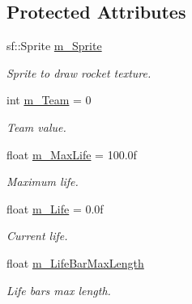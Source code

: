 \subsection*{Protected Attributes}
\begin{DoxyCompactItemize}
\item 
\mbox{\label{class_rocket_a584dfdd155f46944168ebfd23b158bf2}} 
sf\+::\+Sprite \hyperlink{class_rocket_a584dfdd155f46944168ebfd23b158bf2}{m\+\_\+\+Sprite}
\begin{DoxyCompactList}\small\item\em Sprite to draw rocket texture. \end{DoxyCompactList}\item 
\mbox{\label{class_rocket_a5d12b42180029361f37e9ce86a75f1eb}} 
int \hyperlink{class_rocket_a5d12b42180029361f37e9ce86a75f1eb}{m\+\_\+\+Team} = 0
\begin{DoxyCompactList}\small\item\em Team value. \end{DoxyCompactList}\item 
\mbox{\label{class_rocket_a6e8e5f6f965fa1fc8d7919b4c7a7d42b}} 
float \hyperlink{class_rocket_a6e8e5f6f965fa1fc8d7919b4c7a7d42b}{m\+\_\+\+Max\+Life} = 100.\+0f
\begin{DoxyCompactList}\small\item\em Maximum life. \end{DoxyCompactList}\item 
\mbox{\label{class_rocket_a564ba8da5fdab5a6bccef0adfb58864d}} 
float \hyperlink{class_rocket_a564ba8da5fdab5a6bccef0adfb58864d}{m\+\_\+\+Life} = 0.\+0f
\begin{DoxyCompactList}\small\item\em Current life. \end{DoxyCompactList}\item 
\mbox{\label{class_rocket_a66c5adff518ec4cd545a3a669e8448c7}} 
float \hyperlink{class_rocket_a66c5adff518ec4cd545a3a669e8448c7}{m\+\_\+\+Life\+Bar\+Max\+Length}
\begin{DoxyCompactList}\small\item\em Life bar\textquotesingle{}s max length. \end{DoxyCompactList}\item 

\end{DoxyCompactItemize}
